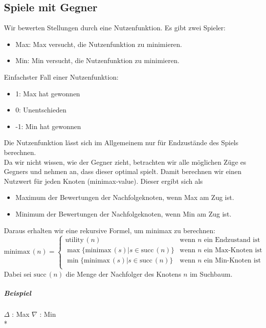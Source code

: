 \documentclass[a4paper]{scrartcl}
\begin{document}
\subsection{Spiele mit Gegner}
Wir bewerten Stellungen durch eine Nutzenfunktion. Es gibt zwei Spieler:
\begin{itemize}
\item Max: Max versucht, die Nutzenfunktion zu minimieren.
\item Min: Min versucht, die Nutzenfunktion zu minimieren.
\end{itemize}
Einfachster Fall einer Nutzenfunktion:
\begin{itemize}
\item 1: Max hat gewonnen
\item 0: Unentschieden
\item -1: Min hat gewonnen
\end{itemize}
Die Nutzenfunktion lässt sich im Allgemeinem nur für Endzustände des Spiels berechnen.\\
Da wir nicht wissen, wie der Gegner zieht, betrachten wir alle möglichen Züge es Gegners und nehmen an, dass dieser optimal spielt. Damit berechnen wir einen Nutzwert für jeden Knoten (minimax-value). Dieser ergibt sich als
\begin{itemize}
\item Maximum der Bewertungen der Nachfolgeknoten, wenn Max am Zug ist.
\item Minimum der Bewertungen der Nachfolgeknoten, wenn Min am Zug ist.
\end{itemize}
Daraus erhalten wir eine rekursive Formel, um minimax zu berechnen:
\[ \text{minimax} \, (n) = \left \{ \begin{array}{lr} \text{utility}\, (n) & \text{wenn } n  \text{ ein} \text{ Endzustand ist} \\
\max{\{ \text{minimax}\, (s) | s \in \text{succ}\, (n) \}} & \text{wenn } n \text{ ein Max-Knoten ist} \\
\min{\{ \text{minimax} \, (s) | s \in \text{succ}\, (n) \}} & \text{wenn } n \text{ ein Min-Knoten ist} \\
\end{array} \right. \]
Dabei sei $\text{succ} \, (n)$ die Menge der Nachfolger des Knotens $n$ im Suchbaum.
\subparagraph{Beispiel} $\Delta$ : Max $\nabla$ : Min\\*
\\
\end{document}
